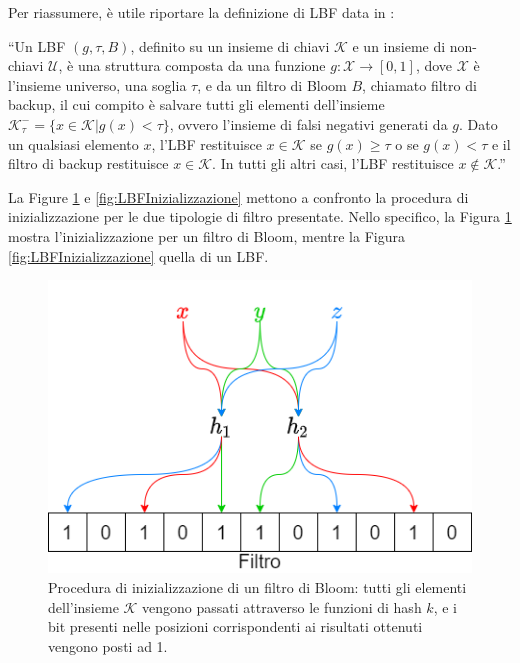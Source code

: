 \documentclass[../../main.tex]{subfiles}
\begin{document}
    Per riassumere, è utile riportare la definizione di LBF data in \cite{10.5555/3326943.3326986}: 

    ``Un LBF $(g, \tau, B)$, definito su un insieme di chiavi $\mathcal{K}$ e un insieme di non-chiavi $\mathcal{U}$, è una struttura composta da una funzione $g : \mathcal{X} \rightarrow [0,1]$, dove $\mathcal{X}$ è l'insieme universo, una soglia $\tau$, e da un filtro di Bloom $B$, chiamato filtro di backup, il cui compito è salvare tutti gli elementi dell'insieme $\mathcal{K}_{\tau}^- = \{x \in \mathcal{K} | g(x) < \tau\}$, ovvero l'insieme di falsi negativi generati da $g$. Dato un qualsiasi elemento $x$, l'LBF restituisce $x \in \mathcal{K}$ se $g(x) \geq \tau$ o se $g(x) < \tau$ e il filtro di backup restituisce $x \in \mathcal{K}$. In tutti gli
    altri casi, l’LBF restituisce $x\notin \mathcal{K}$.''

    La Figure \ref{fig:BFInizializzazione} e \ref{fig:LBFInizializzazione} mettono a confronto la procedura di inizializzazione per le due tipologie di filtro presentate. Nello specifico, la Figura \ref{fig:BFInizializzazione} mostra l'inizializzazione per un filtro di Bloom, mentre la Figura \ref{fig:LBFInizializzazione} quella di un LBF.

    \begin{figure}[H]
        \centering
        \includegraphics[width=\textwidth]{immagini/5_1/BFInizializzazione.png}
        \caption{Procedura di inizializzazione di un filtro di Bloom: tutti gli elementi dell'insieme $\mathcal{K}$ vengono passati attraverso le funzioni di hash $k$, e i bit presenti nelle posizioni corrispondenti ai risultati ottenuti vengono posti ad 1.}
        \label{fig:BFInizializzazione}
    \end{figure}
\end{document}
